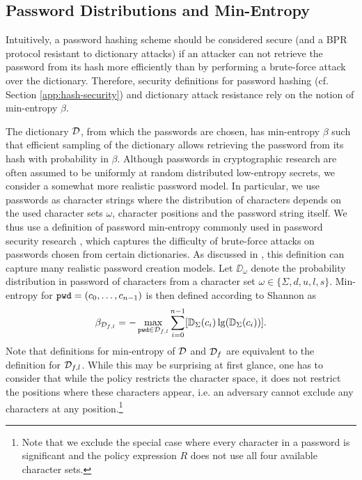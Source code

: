 \subsection{Password Distributions and Min-Entropy} \label{sec:min-entropy}
Intuitively, a password hashing scheme should be considered secure (and a BPR protocol resistant to dictionary attacks) if an attacker can not retrieve the password from its hash more efficiently than by performing a brute-force attack over the dictionary. Therefore, security definitions for password hashing (cf. Section \ref{app:hash-security}) and dictionary attack resistance rely on the notion of min-entropy $\beta$.

The dictionary $\mathcal{D}$, from which the passwords are chosen, has min-entropy $\beta$ such that efficient sampling of the dictionary allows retrieving the password from its hash with probability in $\beta$.
Although passwords in cryptographic research are often assumed to be uniformly at random distributed low-entropy secrets, we consider a somewhat more realistic password model.
In particular, we use passwords as character strings where the distribution of characters depends on the used character sets $\omega$, character positions and the password string itself.
We thus use a definition of password min-entropy commonly used in password security research \cite{ShayKKLMBCC10,KomanduriSKMBCCE11,MazurekKVBCCKSU13}, which captures the difficulty of brute-force attacks on passwords chosen from certain dictionaries.
As discussed in \cite{ShayKKLMBCC10,KomanduriSKMBCCE11}, this definition can capture many realistic password creation models.
Let $\DD_\omega$ denote the probability distribution in password \pwd of characters from a character set $\omega\in\{\Sigma,d,u,l,s\}$.
Min-entropy for $\mathtt{pwd}=(c_0,\dots,c_{n-1})$ is then defined according to Shannon \cite{shannon48} as
\[
  \beta_{\mathcal{D}_{f,l}} = -\max_{\mathtt{pwd}\in \mathcal{D}_{f,l}} \sum_{i=0}^{n-1} [\mathbb{D}_\Sigma(c_i)\lg(\mathbb{D}_\Sigma(c_i))].
\]
Note that definitions for min-entropy of $\mathcal{D}$ and $\mathcal{D}_f$ are equivalent to the definition for $\mathcal{D}_{f,l}$.
While this may be surprising at first glance, one has to consider that while the policy restricts the character space, it does not restrict the positions where these characters appear, i.e. an adversary cannot exclude any characters at any position.\footnote{Note that we exclude the special case where every character in a password is significant and the policy expression $R$ does not use all four available character sets.}

